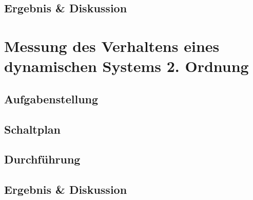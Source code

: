 \documentclass[12pt,a4paper,titlepage]{article}
\begin{document}
\subsection{Ergebnis \& Diskussion}

\section{Messung des Verhaltens eines dynamischen Systems 2. Ordnung}

\subsection{Aufgabenstellung}

\subsection{Schaltplan}

\subsection{Durchf\"uhrung}

\subsection{Ergebnis \& Diskussion}
\end{document}
